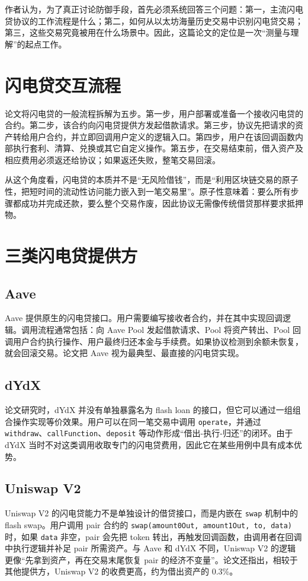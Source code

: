 \documentclass[UTF8,11pt]{ctexart}
\begin{document}
作者认为，为了真正讨论防御手段，首先必须系统回答三个问题：第一，主流闪电贷协议的工作流程是什么；第二，如何从以太坊海量历史交易中识别闪电贷交易；第三，这些交易究竟被用在什么场景中。因此，这篇论文的定位是一次“测量与理解”的起点工作。

\section{闪电贷交互流程}
论文将闪电贷的一般流程拆解为五步。第一步，用户部署或准备一个接收闪电贷的合约。第二步，该合约向闪电贷提供方发起借款请求。第三步，协议先把请求的资产转给用户合约，并立即回调用户定义的逻辑入口。第四步，用户在该回调函数内部执行套利、清算、兑换或其它自定义操作。第五步，在交易结束前，借入资产及相应费用必须返还给协议；如果返还失败，整笔交易回滚。

从这个角度看，闪电贷的本质并不是“无风险借钱”，而是“利用区块链交易的原子性，把短时间的流动性访问能力嵌入到一笔交易里”。原子性意味着：要么所有步骤都成功并完成还款，要么整个交易作废，因此协议无需像传统借贷那样要求抵押物。

\section{三类闪电贷提供方}
\subsection{Aave}
Aave 提供原生的闪电贷接口。用户需要编写接收者合约，并在其中实现回调逻辑。调用流程通常包括：向 Aave Pool 发起借款请求、Pool 将资产转出、Pool 回调用户合约执行操作、用户最终归还本金与手续费。如果协议检测到余额未恢复，就会回滚交易。论文把 Aave 视为最典型、最直接的闪电贷实现。

\subsection{dYdX}
论文研究时，dYdX 并没有单独暴露名为 flash loan 的接口，但它可以通过一组组合操作实现等价效果。用户可以在同一笔交易中调用 \texttt{operate}，并通过 \texttt{withdraw}、\texttt{callFunction}、\texttt{deposit} 等动作形成“借出-执行-归还”的闭环。由于 dYdX 当时不对这类调用收取专门的闪电贷费用，因此它在某些用例中具有成本优势。

\subsection{Uniswap V2}
Uniswap V2 的闪电贷能力不是单独设计的借贷接口，而是内嵌在 \texttt{swap} 机制中的 flash swap。用户调用 pair 合约的 \texttt{swap(amount0Out, amount1Out, to, data)} 时，如果 \texttt{data} 非空，pair 会先把 token 转出，再触发回调函数，由调用者在回调中执行逻辑并补足 pair 所需资产。与 Aave 和 dYdX 不同，Uniswap V2 的逻辑更像“先拿到资产，再在交易末尾恢复 pair 的经济不变量”。论文还指出，相较于其他提供方，Uniswap V2 的收费更高，约为借出资产的 0.3\%。
\end{document}
